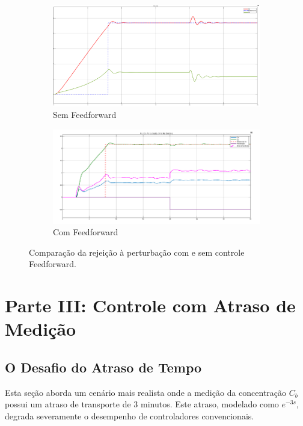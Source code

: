 \documentclass[a4paper,12pt]{report}
\begin{document}
\begin{figure}[H]
     \centering
     \begin{subfigure}[b]{0.48\textwidth}
         \centering
         \includegraphics[width=\textwidth]{"Trabalho 2 Sistemas de Controle/image3.png"}
         \caption{Sem Feedforward}
         \label{fig:sem_ff}
     \end{subfigure}
     \hfill
     \begin{subfigure}[b]{0.48\textwidth}
         \centering
         \includegraphics[width=\textwidth]{"Trabalho 2 Sistemas de Controle/image2.png"}
         \caption{Com Feedforward}
         \label{fig:com_ff}
     \end{subfigure}
     \caption{Comparação da rejeição à perturbação com e sem controle Feedforward.}
\end{figure}

\chapter{Parte III: Controle com Atraso de Medição}
\section{O Desafio do Atraso de Tempo}
Esta seção aborda um cenário mais realista onde a medição da concentração \(C_b\) possui um atraso de transporte de 3 minutos. Este atraso, modelado como \(e^{-3s}\), degrada severamente o desempenho de controladores convencionais.
\end{document}
